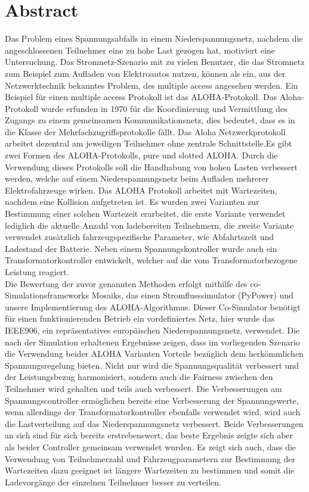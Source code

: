 \thispagestyle{plain}

\section*{Abstract}
Das Problem eines Spannungsabfalls in einem Niederspannungsnetz, nachdem die angeschlossenen Teilnehmer eine zu hohe Last gezogen hat, motiviert eine Untersuchung. Das Stromnetz-Szenario mit zu vielen Benutzer, die das Stromnetz zum Beispiel zum Aufladen von Elektroautos nutzen, können als ein, aus der Netzwerktechnik bekanntes Problem, des multiple access angesehen werden. Ein Beispiel für einen multiple access Protokoll ist das ALOHA-Protokoll. Das Aloha-Protokoll wurde erfunden in 1970 für die Koordinierung und Vermittlung des Zugangs zu einem gemeinsamen Kommunikationsnetz, dies bedeutet, dass es in die Klasse der Mehrfachzugriffsprotokolle fällt. Das Aloha Netzwerkprotokoll arbeitet dezentral am jeweiligen Teilnehmer ohne zentrale Schnittstelle.Es gibt zwei Formen des ALOHA-Protokolls, pure und slotted ALOHA. Durch die Verwendung dieses Protokolls soll die Handhabung von hohen Lasten verbessert werden, welche auf einem Niederspannungsnetz beim Aufladen mehrerer Elektrofahrzeuge wirken. Das ALOHA Protokoll arbeitet mit Wartezeiten, nachdem eine Kollision aufgetreten ist. Es wurden zwei Varianten zur Bestimmung einer solchen Wartezeit erarbeitet, die erste Variante  verwendet lediglich die aktuelle Anzahl von ladebereiten Teilnehmern, die zweite Variante verwendet zusätzlich fahrzeugspezifische Parameter, wie Abfahrtszeit und Ladestand der Batterie. Neben einem Spannungskontroller wurde auch ein Transformatorkontroller entwickelt, welcher auf die vom Transformatorbezogene Leistung reagiert.\\
Die Bewertung der zuvor genannten Methoden erfolgt mithilfe des co-Simulationsframeworks Mosaiks, das einen Stromflusssimulator (PyPower) und unsere Implementierung des ALOHA-Algorithmus. Dieser Co-Simulator benötigt für einen funktionierenden Betrieb ein vordefiniertes Netz, hier wurde das IEEE906, ein repräsentatives europäischen Niederspannungsnetz, verwendet. Die nach der Simulation erhaltenen Ergebnisse zeigen, dass im vorliegenden Szenario die Verwendung beider ALOHA Varianten Vorteile bezüglich dem herkömmlichen Spannungsregelung bieten. Nicht nur wird die Spannungsqualität verbessert und der Leistungsbezug harmonisiert, sondern auch die Fairness zwischen den Teilnehmer wird gehalten und teils auch verbessert. Die Verbesserungen am Spannungscontroller ermöglichen bereits eine Verbesserung der Spannungswerte, wenn allerdings der Transformatorkontroller ebenfalls verwendet wird, wird auch die Lastverteilung auf das Niederspannungsnetz verbessert. Beide Verbesserungen an sich sind für sich bereits erstrebenswert, das beste Ergebnis zeigte sich aber als beider Controller gemeinsam verwendet wurden. Es zeigt sich auch, dass die Verwendung von Teilnehmerzahl und Fahrzeugparametern zur Bestimmung der Wartezeiten dazu geeignet ist längere Wartezeiten zu bestimmen und somit die Ladevorgänge der einzelnen Teilnehmer besser zu verteilen.
